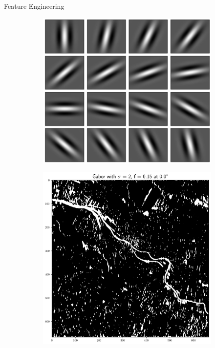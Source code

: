 \documentclass[final]{beamer}
\newlength{\colwidth}
\begin{document}
\begin{frame}[t]
\begin{columns}[t]
\begin{column}{\colwidth}
\begin{block}{Feature Engineering}
     \begin{figure}
       \begin{subfigure}{0.34\textwidth}
      \centering
      \includegraphics[width=\textwidth]{figures/gabor}
    \end{subfigure}
    \begin{subfigure}{0.34\textwidth}
      \centering
      \includegraphics[width=\textwidth]{figures/features}
    \end{subfigure}
    \end{figure}


\end{block}
\end{column}
\end{columns}
\end{frame}
\end{document}
